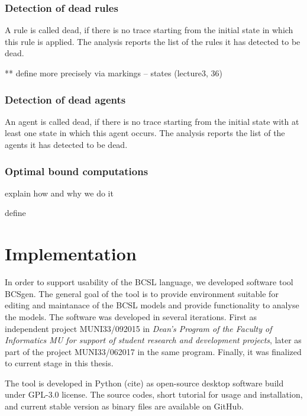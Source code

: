\documentclass[12pt]{fithesis2}
\begin{document}
\subsection{Detection of dead rules}

A rule is called dead, if there is no trace starting from the initial state in which this rule is applied. The analysis reports the list of the rules it has detected to be dead. 

** define more precisely via markings -- states (lecture3, 36)

\subsection{Detection of dead agents}

An agent is called dead, if there is no trace starting from the initial state with at least one state in which this agent occurs. The analysis reports the list of the agents it has detected to be dead.

\subsection{Optimal bound computations}

explain how and why we do it

define

\chapter{Implementation}

In order to support usability of the BCSL language, we developed software tool BCSgen. The general goal of the tool is to provide environment suitable for editing and maintanace of the BCSL models and provide functionality to analyse the models. The software was developed in several iterations. First as independent project MUNI33/092015 in \emph{Dean's Program of the Faculty of Informatics MU for support of student research and development projects}, later as part of the project MUNI33/062017 in the same program. Finally, it was finalized to current stage in this thesis.

The tool is developed in Python (cite) as open-source desktop software build under GPL-3.0 license. The source codes, short tutorial for usage and installation, and current stable version as binary files are available on GitHub\footnotemark[1].
\end{document}

